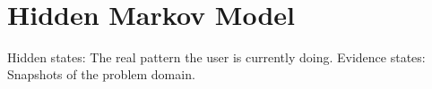 ­\section{Hidden Markov Model}
Hidden states: The real pattern the user is currently doing.
Evidence states: Snapshots of the problem domain.
